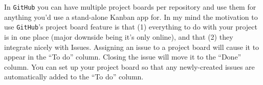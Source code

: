 \documentclass[12pt,letterpaper]{article}
\begin{document}
In \texttt{GitHub} you can have multiple project boards per repository and use 
them for anything you'd use a stand-alone Kanban app for.
In my mind the motivation to use \texttt{GitHub}'s project board feature is that
(1) everything to do with your project is in one place (major downside being it's only online), and that
(2) they integrate nicely with Issues.
Assigning an issue to a project board will cause it to appear in the ``To do'' column.
Closing the issue will move it to the ``Done'' column.
You can set up your project board so that any newly-created issues are automatically added to the ``To do'' column.
\end{document}
